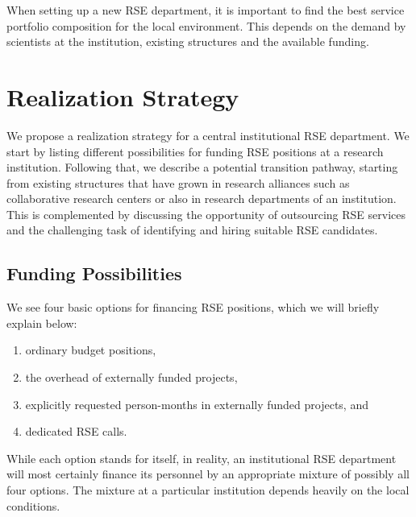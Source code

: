\documentclass[a4paper]{article}
\begin{document}
When setting up a new RSE department, it is important to find the best service portfolio composition for the local environment.
This depends on the demand by scientists at the institution, existing structures and the available funding.

\section{Realization Strategy}
\label{sec:realization}

We propose a realization strategy for a central institutional RSE department.
We start by listing different possibilities for funding RSE positions at a research institution.
Following that, we describe a potential transition pathway, starting from existing structures that have grown in research alliances such as collaborative research centers or also in research departments of an institution.
This is complemented by discussing the opportunity of outsourcing RSE services and the challenging task of identifying and hiring suitable RSE candidates.

\subsection{Funding Possibilities}
\label{sec:funding}

We see four basic options for financing RSE positions, which we will briefly explain below:
\begin{enumerate}
\item ordinary budget positions,
\item the overhead of externally funded projects,
\item explicitly requested person-months in externally funded projects, and
\item dedicated RSE calls.
\end{enumerate}
While each option stands for itself, in reality, an institutional RSE department will most certainly finance its personnel by an appropriate mixture of possibly all four options.
The mixture at a particular institution depends heavily on the local conditions.
\end{document}
